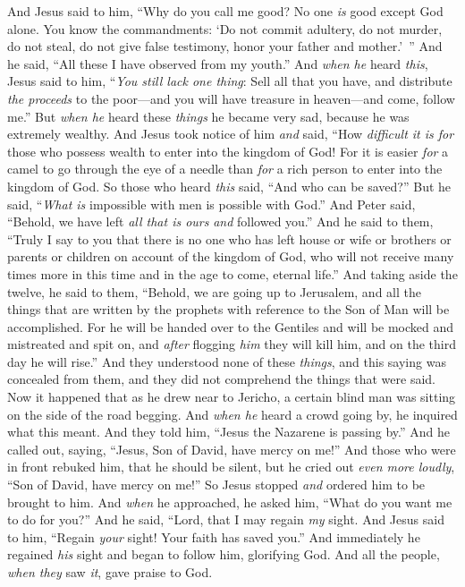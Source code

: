 \begin{biblechapter}
\verse And Jesus said to him, “Why do you call me good? No one \textit{is} good except God alone.
\verse You know the commandments: ‘Do not commit adultery, do not murder, do not steal, do not give false testimony, honor your father and mother.’ ”
\verse And he said, “All these I have observed from my youth.”
\verse And \textit{when he} heard \textit{this}, Jesus said to him, “\textit{You still lack one thing}: Sell all that you have, and distribute \textit{the proceeds} to the poor—and you will have treasure in heaven—and come, follow me.”
\verse But \textit{when he} heard these \textit{things} he became very sad, because he was extremely wealthy.
\verse And Jesus took notice of him \textit{and} said, “How \textit{difficult it is for} those who possess wealth to enter into the kingdom of God!
\verse For it is easier \textit{for} a camel to go through the eye of a needle than \textit{for} a rich person to enter into the kingdom of God.
\verse So those who heard \textit{this} said, “And who can be saved?”
\verse But he said, “\textit{What is} impossible with men is possible with God.”
\verse And Peter said, “Behold, we have left \textit{all that is ours} \textit{and} followed you.”
\verse And he said to them, “Truly I say to you that there is no one who has left house or wife or brothers or parents or children on account of the kingdom of God,
\verse who will not receive many times more in this time and in the age to come, eternal life.”
 And taking aside the twelve, he said to them, “Behold, we are going up to Jerusalem, and all the things that are written by the prophets with reference to the Son of Man will be accomplished.
\verse For he will be handed over to the Gentiles and will be mocked and mistreated and spit on,
\verse and \textit{after} flogging \textit{him} they will kill him, and on the third day he will rise.”
\verse And they understood none of these \textit{things}, and this saying was concealed from them, and they did not comprehend the things that were said.
 Now it happened that as he drew near to Jericho, a certain blind man was sitting on the side of the road begging.
\verse And \textit{when he} heard a crowd going by, he inquired what this meant.
\verse And they told him, “Jesus the Nazarene is passing by.”
\verse And he called out, saying, “Jesus, Son of David, have mercy on me!”
\verse And those who were in front rebuked him, that he should be silent, but he cried out \textit{even more loudly}, “Son of David, have mercy on me!”
\verse So Jesus stopped \textit{and} ordered him to be brought to him. And \textit{when} he approached, he asked him,
\verse “What do you want me to do for you?” And he said, “Lord, that I may regain \textit{my} sight.
\verse And Jesus said to him, “Regain \textit{your} sight! Your faith has saved you.”
\verse And immediately he regained \textit{his} sight and began to follow him, glorifying God. And all the people, \textit{when they} saw \textit{it}, gave praise to God.
\end{biblechapter}

